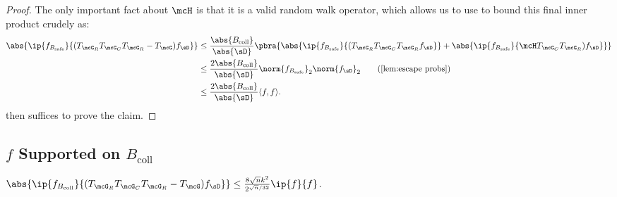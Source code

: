 \begin{proof}
The only important fact about $\mcH$ is that it is a valid random walk operator, which allows us to use  to bound this final inner product crudely as:
\begin{align*}
    \abs{\ip{f_{B_{\mathrm{safe}}}}{(T_{\mcG_R}T_{\mcG_C}T_{\mcG_R} - T_\mcG) f_{\sD}}} &\leq \frac{\abs{B_{\mathrm{coll}}}}{\abs{\sD}} \pbra{\abs{\ip{f_{B_{\mathrm{safe}}}}{(T_{\mcG_R}T_{\mcG_C}T_{\mcG_R} f_{\sD}}} + \abs{\ip{f_{B_{\mathrm{safe}}}}{\mcH T_{\mcG_C}T_{\mcG_R}) f_{\sD}}}}\\
    &\leq \frac{2\abs{B_{\mathrm{coll}}}}{\abs{\sD}} \norm{f_{B_{\mathrm{safe}}}}_{2} \norm{f_\sD}_{2} \tag{\Cref{lem:escape probs}}\\ 
    &\leq \frac{2\abs{B_{\mathrm{coll}}}}{\abs{\sD}} \langle f, f \rangle.
\end{align*}
 then suffices to prove the claim. \end{proof}

\subsection{$f$ Supported on $B_{\textrm{coll}}$}

\begin{lemma}
    \label{lem:collcase}
    $\abs{\ip{f_{B_{\mathrm{coll}}}}{(T_{\mcG_R}T_{\mcG_C}T_{\mcG_R} - T_\mcG) f_\sD}} \leq \frac{8\sqrt{n}k^2}{2^{\sqrt{n}/32}} \ip{f}{f}$.
\end{lemma}


